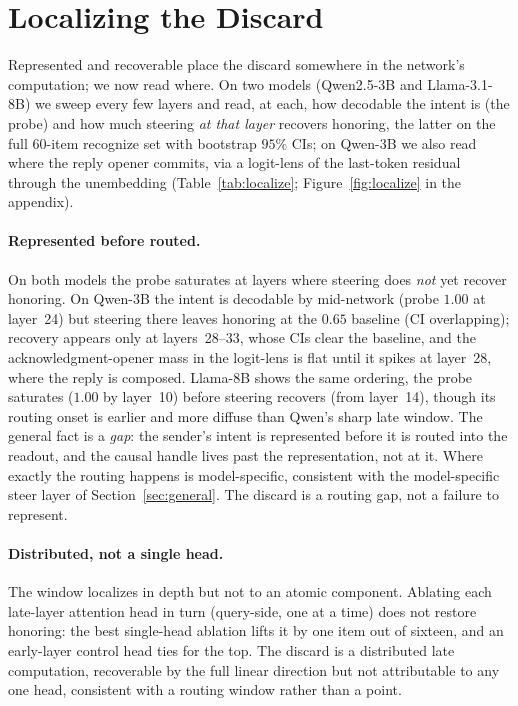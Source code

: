 \documentclass[11pt]{article}
\begin{document}
\section{Localizing the Discard}
\label{sec:localize}
Represented and recoverable place the discard somewhere in the network's computation; we now read where. On
two models (Qwen2.5-3B and Llama-3.1-8B) we sweep every few layers and read, at each, how decodable the intent
is (the probe) and how much steering \emph{at that layer} recovers honoring, the latter on the full $60$-item
recognize set with bootstrap $95\%$ CIs; on Qwen-3B we also read where the reply opener commits, via a
logit-lens of the last-token residual through the unembedding \citep{belrose2023tunedlens}
(Table~\ref{tab:localize}; Figure~\ref{fig:localize} in the appendix).

\paragraph{Represented before routed.} On both models the probe saturates at layers where steering does
\emph{not} yet recover honoring. On Qwen-3B the intent is decodable by mid-network (probe $1.00$ at layer~24)
but steering there leaves honoring at the $0.65$ baseline (CI overlapping); recovery appears only at
layers~28--33, whose CIs clear the baseline, and the acknowledgment-opener mass in the logit-lens is flat until
it spikes at layer~28, where the reply is composed. Llama-8B shows the same ordering, the probe saturates
($1.00$ by layer~10) before steering recovers (from layer~14), though its routing onset is earlier and more
diffuse than Qwen's sharp late window. The general fact is a \emph{gap}: the sender's intent is represented
before it is routed into the readout, and the causal handle lives past the representation, not at it. Where
exactly the routing happens is model-specific, consistent with the model-specific steer layer of
Section~\ref{sec:general}. The discard is a routing gap, not a failure to represent.


\paragraph{Distributed, not a single head.} The window localizes in depth but not to an atomic component.
Ablating each late-layer attention head in turn (query-side, one at a time) does not restore honoring: the
best single-head ablation lifts it by one item out of sixteen, and an early-layer control head ties for the
top. The discard is a distributed late computation, recoverable by the full linear direction but not
attributable to any one head, consistent with a routing window rather than a point.
\end{document}
